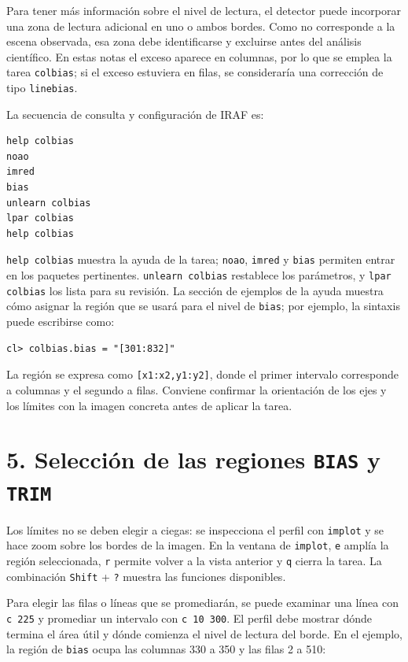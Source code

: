 \documentclass[11pt]{article}
\begin{document}
Para tener más información sobre el nivel de lectura, el detector puede
incorporar una zona de lectura adicional en uno o ambos bordes. Como no
corresponde a la escena observada, esa zona debe identificarse y excluirse antes
del análisis científico. En estas notas el exceso aparece en columnas, por lo
que se emplea la tarea \texttt{colbias}; si el exceso estuviera en filas, se
consideraría una corrección de tipo \texttt{linebias}.

\begin{center}
  
\end{center}

La secuencia de consulta y configuración de IRAF es:

\begin{verbatim}
help colbias
noao
imred
bias
unlearn colbias
lpar colbias
help colbias
\end{verbatim}

\texttt{help colbias} muestra la ayuda de la tarea; \texttt{noao},
\texttt{imred} y \texttt{bias} permiten entrar en los paquetes pertinentes.
\texttt{unlearn colbias} restablece los parámetros, y \texttt{lpar colbias}
los lista para su revisión. La sección de ejemplos de la ayuda muestra cómo
asignar la región que se usará para el nivel de \texttt{bias}; por ejemplo, la
sintaxis puede escribirse como:

\begin{verbatim}
cl> colbias.bias = "[301:832]"
\end{verbatim}

La región se expresa como \texttt{[x1:x2,y1:y2]}, donde el primer intervalo
corresponde a columnas y el segundo a filas. Conviene confirmar la orientación
de los ejes y los límites con la imagen concreta antes de aplicar la tarea.

\newpage
\section*{5. Selección de las regiones \texttt{BIAS} y \texttt{TRIM}}

Los límites no se deben elegir a ciegas: se inspecciona el perfil con
\texttt{implot} y se hace zoom sobre los bordes de la imagen. En la ventana de
\texttt{implot}, \texttt{e} amplía la región seleccionada, \texttt{r} permite
volver a la vista anterior y \texttt{q} cierra la tarea. La combinación
\texttt{Shift} + \texttt{?} muestra las funciones disponibles.

Para elegir las filas o líneas que se promediarán, se puede examinar una línea
con \texttt{c 225} y promediar un intervalo con \texttt{c 10 300}. El perfil
debe mostrar dónde termina el área útil y dónde comienza el nivel de lectura
del borde. En el ejemplo, la región de \texttt{bias} ocupa las columnas 330 a
350 y las filas 2 a 510:
\end{document}
